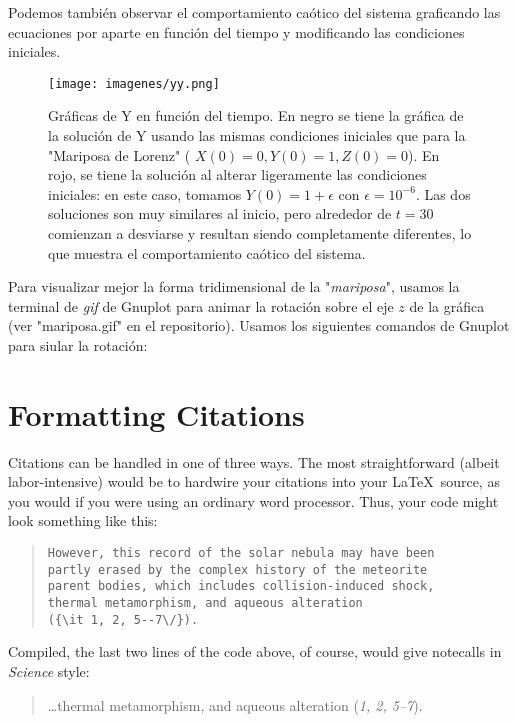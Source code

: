 \documentclass[letterpaper, 12pt]{article}
\begin{document}
{Podemos tambi\'en observar el comportamiento ca\'otico del sistema graficando las ecuaciones por aparte en funci\'on del tiempo y modificando las condiciones iniciales. 

\begin{figure} [h]
\centering
\texttt{[image: imagenes/yy.png]}
\caption{Gr\'aficas de Y en funci\'on del tiempo. En negro se tiene la gr\'afica de la soluci\'on de Y usando las mismas condiciones iniciales que para la "Mariposa de Lorenz" ( $X(0) = 0, Y(0) = 1, Z(0) = 0$). En rojo, se tiene la soluci\'on al alterar ligeramente las condiciones iniciales: en este caso, tomamos $Y(0) = 1 + \epsilon$ con $\epsilon = 10^{-6}$. Las dos soluciones son muy similares al inicio, pero alrededor de $t = 30$ comienzan a desviarse y resultan siendo completamente diferentes, lo que muestra el comportamiento ca\'otico del sistema.}
\end{figure}


Para visualizar mejor la forma tridimensional de la "\textit{mariposa}", usamos la terminal de \textit{gif} de Gnuplot para animar la rotaci\'on sobre el eje $z$ de la gr\'afica (ver "mariposa.gif" en el repositorio). Usamos los siguientes comandos de Gnuplot para siular la rotaci\'on:



\section*{Formatting Citations}

Citations can be handled in one of three ways.  The most
straightforward (albeit labor-intensive) would be to hardwire your
citations into your \LaTeX\ source, as you would if you were using an
ordinary word processor.  Thus, your code might look something like
this:


\begin{quote}
\begin{verbatim}
However, this record of the solar nebula may have been
partly erased by the complex history of the meteorite
parent bodies, which includes collision-induced shock,
thermal metamorphism, and aqueous alteration
({\it 1, 2, 5--7\/}).
\end{verbatim}
\end{quote}


\noindent Compiled, the last two lines of the code above, of course, would give notecalls in {\it Science\/} style:

\begin{quote}
\ldots thermal metamorphism, and aqueous alteration ({\it 1, 2, 5--7\/}).
\end{quote}

}
\end{document}
